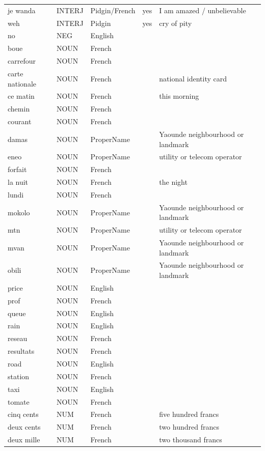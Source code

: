 \documentclass[11pt,a4paper]{article}
\begin{document}
\begin{longtable}{L{0.16} L{0.09} L{0.13} L{0.05} L{0.34}}
je wanda & INTERJ & Pidgin/French & yes & I am amazed / unbelievable \\
weh & INTERJ & Pidgin & yes & cry of pity \\
no & NEG & English &  &  \\
boue & NOUN & French &  &  \\
carrefour & NOUN & French &  &  \\
carte nationale & NOUN & French &  & national identity card \\
ce matin & NOUN & French &  & this morning \\
chemin & NOUN & French &  &  \\
courant & NOUN & French &  &  \\
damas & NOUN & ProperName &  & Yaounde neighbourhood or landmark \\
eneo & NOUN & ProperName &  & utility or telecom operator \\
forfait & NOUN & French &  &  \\
la nuit & NOUN & French &  & the night \\
lundi & NOUN & French &  &  \\
mokolo & NOUN & ProperName &  & Yaounde neighbourhood or landmark \\
mtn & NOUN & ProperName &  & utility or telecom operator \\
mvan & NOUN & ProperName &  & Yaounde neighbourhood or landmark \\
obili & NOUN & ProperName &  & Yaounde neighbourhood or landmark \\
price & NOUN & English &  &  \\
prof & NOUN & French &  &  \\
queue & NOUN & English &  &  \\
rain & NOUN & English &  &  \\
reseau & NOUN & French &  &  \\
resultats & NOUN & French &  &  \\
road & NOUN & English &  &  \\
station & NOUN & French &  &  \\
taxi & NOUN & English &  &  \\
tomate & NOUN & French &  &  \\
cinq cents & NUM & French &  & five hundred francs \\
deux cents & NUM & French &  & two hundred francs \\
deux mille & NUM & French &  & two thousand francs \\

\end{longtable}
\end{document}
